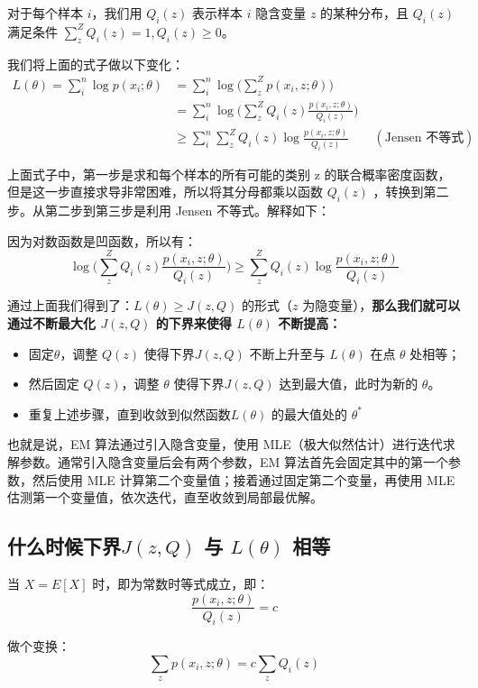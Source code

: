 \documentclass[12pt]{article}
\begin{document}
对于每个样本 $i$，我们用 $Q_i(z)$ 表示样本 $i$ 隐含变量 $z$ 的某种分布，且 $Q_i(z)$ 满足条件 $\sum_z^ZQ_i(z) = 1, Q_i(z) \ge 0$。

我们将上面的式子做以下变化：
\begin{align*}
L(\theta) = \sum_i^n\log{p(x_i; \theta)} &=  \sum_i^n\log\Big(\sum_z^Zp(x_i, z;\theta)\Big) \\
	&= \sum_i^n\log\Big(\sum_z^ZQ_i(z)\frac{p(x_i, z;\theta)}{Q_i(z)}\Big) \\
	&\ge \sum_i^n\sum_z^ZQ_i(z)\log\frac{p(x_i, z;\theta)}{Q_i(z)} \qquad (\text{Jensen 不等式})
\end{align*}

上面式子中，第一步是求和每个样本的所有可能的类别 z 的联合概率密度函数，但是这一步直接求导非常困难，所以将其分母都乘以函数 $Q_i(z)$ ，转换到第二步。从第二步到第三步是利用 Jensen 不等式。解释如下：

因为对数函数是凹函数，所以有：
$$
\log\Big(\sum_z^Z{Q_i(z)\frac{p(x_i,z;\theta)}{Q_i(z)}}\Big) \ge \sum_z^ZQ_i(z)\log{\frac{p(x_i,z;\theta)}{Q_i(z)}}
$$

通过上面我们得到了：$L(\theta) \ge J(z,Q)$ 的形式（$z$ 为隐变量），\textbf{那么我们就可以通过不断最大化 $J(z,Q)$ 的下界来使得 $L(\theta)$ 不断提高：}
\begin{itemize}
\setlength{\itemsep}{0pt}
\setlength{\parsep}{0pt}
\setlength{\parskip}{0pt}
    \item 固定$\theta$，调整 $Q(z)$ 使得下界$J(z,Q)$ 不断上升至与 $L(\theta)$ 在点 $\theta$ 处相等；
    \item 然后固定 $Q(z)$，调整 $\theta$ 使得下界$J(z,Q)$ 达到最大值，此时为新的 $\theta$。
    \item 重复上述步骤，直到收敛到似然函数$L(\theta)$ 的最大值处的 $\theta^*$
\end{itemize}

也就是说，EM 算法通过引入隐含变量，使用 MLE（极大似然估计）进行迭代求解参数。通常引入隐含变量后会有两个参数，EM 算法首先会固定其中的第一个参数，然后使用 MLE 计算第二个变量值；接着通过固定第二个变量，再使用 MLE 估测第一个变量值，依次迭代，直至收敛到局部最优解。

\subsection{什么时候下界$J(z,Q)$ 与 $L(\theta)$  相等}
当 $X = E[X]$ 时，即为常数时等式成立，即：
$$
\frac{p(x_i, z;\theta)}{Q_i(z)} = c
$$

做个变换：
$$
\sum_z{p(x_i, z;\theta)} = c\sum_z{Q_i(z)}
$$
\end{document}

